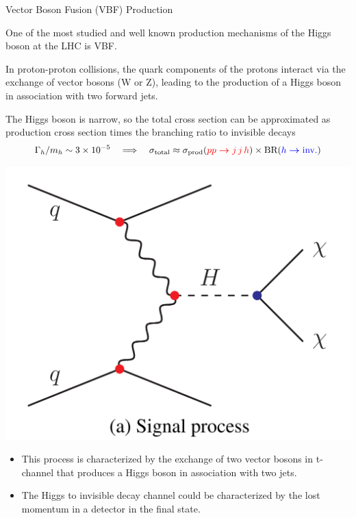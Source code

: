 \documentclass{../../bredelebeamer}
\begin{document}
\begin{frame}{Vector Boson Fusion (VBF) Production}

    One of the most studied and well known production mechanisms of the Higgs boson at the LHC is VBF. 
    
    \vfill 

    In proton-proton collisions, the quark components of the protons interact via the exchange of vector bosons (W or Z), leading to the production of a Higgs boson in association with two forward jets.

    \vfill 

    The Higgs boson is narrow, so the total cross section can be approximated as production cross section times the branching ratio to invisible decays
    \begin{equation*}
            \Gamma_h/m_h \sim 3 \times 10^{-5}
            \quad\Longrightarrow\quad
            \sigma_{\text{total}} \approx \sigma_{\text{prod}} (\textcolor{red}{pp\boldsymbol{\to}j\,j\, h})  \times \text{BR}(\textcolor{blue}{h \boldsymbol{\to} \text{inv.}})
    \end{equation*}

    \begin{minipage}{0.42\textwidth}
        \begin{center}
            \includegraphics[width=\textwidth]{../Images/VBF.png}
        \end{center}
    \end{minipage}
    \hfill
    \begin{minipage}{0.5\textwidth}
        \begin{itemize}
            \item This process is characterized by the exchange of two vector bosons in t-channel that produces a Higgs boson in association with two jets. 
            \vspace{0.5cm}
            \item The Higgs to invisible decay channel could be characterized by the lost momentum in a detector in the final state.
        \end{itemize}
        

    \end{minipage}
\end{frame}
\end{document}
